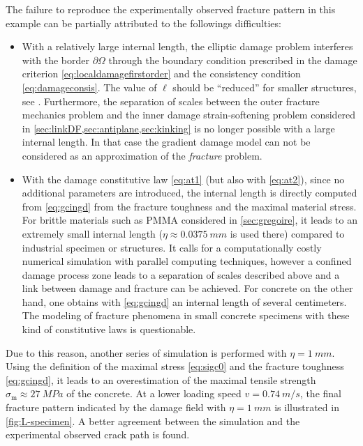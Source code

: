 The failure to reproduce the experimentally observed fracture pattern in this example can be partially attributed to the followings difficulties:
\begin{itemize}
\item With a relatively large internal length, the elliptic damage problem interferes with the border $\partial\Omega$ through the boundary condition prescribed in the damage criterion \eqref{eq:localdamagefirstorder} and the consistency condition \eqref{eq:damageconsis}. The value of $\ell$ should be ``reduced'' for smaller structures, see \cite{LorentzGodard:2011}. Furthermore, the separation of scales between the outer fracture mechanics problem and the inner damage strain-softening problem considered in \cref{sec:linkDF,sec:antiplane,sec:kinking} is no longer possible with a large internal length. In that case the gradient damage model can not be considered as an approximation of the \emph{fracture} problem.

\item With the damage constitutive law \eqref{eq:at1} (but also with \eqref{eq:at2}), since no additional parameters are introduced, the internal length is directly computed from \eqref{eq:gcingd} from the fracture toughness and the maximal material stress. For brittle materials such as PMMA considered in \cref{sec:gregoire}, it leads to an extremely small internal length ($\eta\approx\SI{0.0375}{mm}$ is used there) compared to industrial specimen or structures. It calls for a computationally costly numerical simulation with parallel computing techniques, however a confined damage process zone leads to a separation of scales described above and a link between damage and fracture can be achieved. For concrete on the other hand, one obtains with \eqref{eq:gcingd} an internal length of several centimeters. The modeling of fracture phenomena in small concrete specimens with these kind of constitutive laws is questionable.
\end{itemize}

Due to this reason, another series of simulation is performed with $\eta=\SI{1}{mm}$. Using the definition of the maximal stress \eqref{eq:sigc0} and the fracture toughness \eqref{eq:gcingd}, it leads to an overestimation of the maximal tensile strength $\sigma_\mathrm{m}\approx \SI{27}{MPa}$ of the concrete. At a lower loading speed $v=\SI{0.74}{m/s}$, the final fracture pattern indicated by the damage field with $\eta=\SI{1}{mm}$ is illustrated in \cref{fig:L-specimen}. A better agreement between the simulation and the experimental observed crack path is found.

